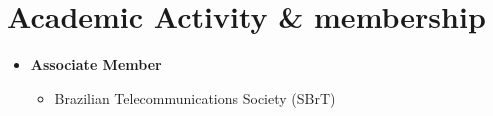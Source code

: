 \section{Academic Activity \& membership}

\begin{itemize}[leftmargin=0.15in, label={}] %
    \item \textbf{Associate Member}
    \begin{itemize}%
        \item Brazilian Telecommunications Society (SBrT)
    \end{itemize}
\end{itemize}